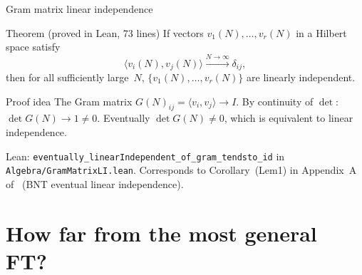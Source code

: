 \documentclass[aspectratio=169,10pt]{beamer}
\begin{document}
\begin{frame}{Gram matrix linear independence}
    \vspace{-0.6em}

    \begin{block}{Theorem (proved in Lean, 73 lines)}
        If vectors $v_1(N),\ldots,v_r(N)$ in a Hilbert space satisfy
        \[
            \langle v_i(N),v_j(N)\rangle \xrightarrow{N\to\infty}  \delta_{ij},
        \]
        then for all sufficiently large~$N$, $\{v_1(N),\ldots,v_r(N)\}$ are linearly independent.
    \end{block}

    \begin{block}{Proof idea}
        The Gram matrix $G(N)_{ij} = \langle v_i, v_j\rangle \to I$.
        By continuity of $\det$: $\det G(N) \to 1 \neq 0$.
        Eventually $\det G(N) \neq 0$, which is equivalent to linear independence.
    \end{block}

    \textcolor{dimwhite}{\footnotesize Lean: \texttt{eventually\_linearIndependent\_of\_gram\_tendsto\_id}
        in \texttt{Algebra/GramMatrixLI.lean}.
        Corresponds to Corollary~(Lem1) in Appendix~A of~\cite{Cirac2017Annals} (BNT eventual linear independence).}
\end{frame}

\section{How far from the most general FT?}
\end{document}
